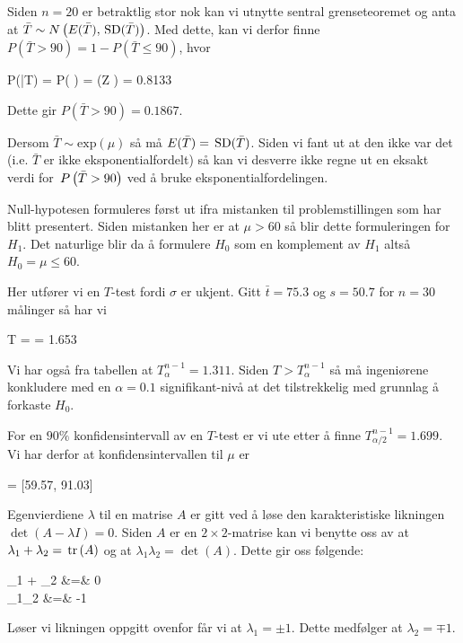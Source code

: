 \deloppgave
Siden $n = 20$ er betraktlig stor nok kan vi utnytte sentral grenseteoremet og anta at $\bar{T}\sim N\left(E(\bar{T}), \,\mathrm{SD}(\bar{T})\right)$. Med dette, kan vi derfor finne $P(\bar{T} > 90) = 1 - P(\bar{T}\leq 90)$, hvor
\begin{likning}
	P(\bar{T}) = P\left( \leq {}\right) = \Phi\left(Z \right) = 0.8133 
\end{likning}
Dette gir $P\left(\bar{T} > 90\right) = 0.1867$.

\deloppgave
Dersom $\bar{T} \sim \mathrm{exp}(\mu)$ så må $E(\bar{T}) = \,\mathrm{SD}(\bar{T})$. Siden vi fant ut at den ikke var det (i.e. $\bar{T}$ er ikke eksponentialfordelt) så kan vi desverre ikke regne ut en eksakt verdi for $\,P\left(\bar{T} > 90\right)$ ved å bruke eksponentialfordelingen.

\deloppgave
Null-hypotesen formuleres først ut ifra mistanken til problemstillingen som har blitt presentert. Siden mistanken her er at $\mu > 60$ så blir dette formuleringen for $H_1$. Det naturlige blir da å formulere $H_0$ som en komplement av $H_1$ altså $H_0 = \mu \leq 60$.

\deloppgave
Her utfører vi en $T$-test fordi $\sigma$ er ukjent. Gitt $\bar{t} = 75.3$ og $s = 50.7$ for $n = 30$ målinger så har vi
\begin{likning}
	T =  = 1.653
\end{likning}
Vi har også fra tabellen at $T_\alpha^{n-1} = 1.311$. Siden $T > T_\alpha^{n-1}$ så må ingeniørene konkludere med en $\alpha = 0.1$ signifikant-nivå at det tilstrekkelig med grunnlag å forkaste $H_0$.

\deloppgave
For en $90\%$ konfidensintervall av en $T$-test er vi ute etter å finne $T_{\alpha/2}^{n-1} = 1.699$. Vi har derfor at konfidensintervallen til $\mu$ er
\begin{likning}
	 = [59.57, 91.03]
\end{likning}

\oppgave
\deloppgave
Egenvierdiene $\lambda$ til en matrise $A$ er gitt ved å løse den karakteristiske likningen $\det(A-\lambda I) = 0$. Siden $A$ er en $2\times 2$-matrise kan vi benytte oss av at $\lambda_1 + \lambda_2 = \,\mathrm{tr}\left(A\right)$ og at $\lambda_1\lambda_2 = \det(A)$. Dette gir oss følgende:
\begin{utregning}
	\lambda_1 + \lambda_2 &=& 0\\
	\lambda_1\lambda_2 &=& -1
\end{utregning}
Løser vi likningen oppgitt ovenfor får vi at $\lambda_1 = \pm 1$. Dette medfølger at $\lambda_2 = \mp 1$. 
\newline

